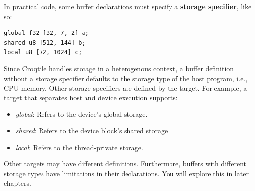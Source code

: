 In practical code, some buffer declarations must specify a \textbf{storage specifier}, like so:

\begin{lstlisting}[language=croqtile,caption={Storage Specifier}]
global f32 [32, 7, 2] a;
shared u8 [512, 144] b;
local u8 [72, 1024] c;
\end{lstlisting}

Since Croqtile handles storage in a heterogenous context, a buffer definition without a storage specifier defaults to the storage type of the host program, i.e., CPU memory. Other storage specifiers are defined by the target. For example, a target that separates host and device execution supports:

\begin{itemize}[leftmargin=1.6em]
\item \emph{global}: Refers to the device's global storage.
\item \emph{shared}: Refers to the device block's shared storage
\item \emph{local}: Refers to the thread-private storage.
\end{itemize}

Other targets may have different definitions. Furthermore, buffers with different storage types have limitations in their declarations. You will explore this in later chapters.
